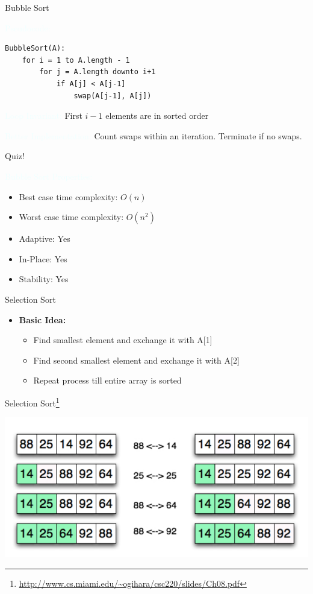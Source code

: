\documentclass{beamer}
\newcommand{\tblue}[1]{{\Large {\textcolor{azure}{#1}}}}
\begin{document}
\begin{frame}[fragile]{Bubble Sort}

\tblue{Pseudocode:}
\begin{verbatim}
BubbleSort(A):
    for i = 1 to A.length - 1
        for j = A.length downto i+1 
            if A[j] < A[j-1]
                swap(A[j-1], A[j])
\end{verbatim}

\tblue{Loop Invariant:} First $i-1$ elements are in sorted order
\vspace{1cm}

\tblue{Better Implementation:} Count swaps within an iteration. Terminate if no swaps.
\end{frame}



\begin{frame}{Quiz!}

\tblue{Bubble Sort Properties:}

\begin{itemize}
\item Best case time complexity:  $O(n)$
\item Worst case time complexity: $O(n^2)$
\item Adaptive: Yes
\item In-Place: Yes
\item Stability: Yes
\end{itemize}
\end{frame}


\begin{frame}{Selection Sort}
\begin{itemize}
\item {\bf Basic Idea:}
\begin{itemize}
    \item Find smallest element and exchange it with A[1]
    \item Find second smallest element and exchange it with A[2]
    \item Repeat process till entire array is sorted
\end{itemize}
\end{itemize}
\end{frame}


\begin{frame}{Selection Sort\footnote{\url{http://www.cs.miami.edu/~ogihara/csc220/slides/Ch08.pdf}}}
\begin{center}
    \includegraphics[scale=0.48]{selectionSort.png}
\end{center}
\end{frame}
\end{document}
